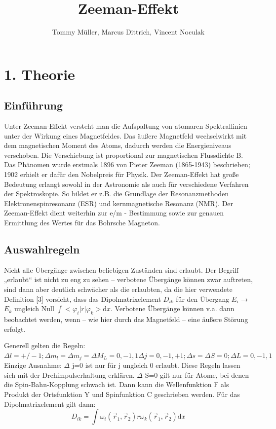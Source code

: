\documentclass[10pt,a4paper]{article}
\author{Tommy Müller, Marcus Dittrich, Vincent Noculak}
\title{Zeeman-Effekt}
\begin{document}
\maketitle
\newpage
\tableofcontents
\newpage

\section{1. Theorie}

\subsection{ Einführung}


Unter Zeeman-Effekt versteht man die Aufspaltung von atomaren Spektrallinien unter der Wirkung eines Magnetfeldes. Das äußere Magnetfeld wechselwirkt mit dem magnetischen Moment des Atoms, dadurch werden die Energieniveaus verschoben. Die Verschiebung ist proportional zur magnetischen Flussdichte B. Das Phänomen wurde erstmals 1896 von Pieter Zeeman (1865-1943) beschrieben; 1902 erhielt er dafür den Nobelpreis für Physik. Der Zeeman-Effekt hat große Bedeutung erlangt sowohl in der Astronomie als auch für verschiedene Verfahren der Spektroskopie. So bildet er z.B. die Grundlage der Resonanzmethoden Elektronenspinresonanz (ESR) und kernmagnetische Resonanz (NMR). Der Zeeman-Effekt dient weiterhin zur e/m - Bestimmung sowie zur genauen Ermittlung des Wertes für das Bohrsche Magneton.


\subsection{ Auswahlregeln}


Nicht alle Übergänge zwischen beliebigen Zuständen sind erlaubt. Der Begriff „erlaubt“ ist nicht zu eng zu sehen – verbotene Übergänge können zwar auftreten, sind dann aber deutlich schwächer als die erlaubten, da die hier verwendete Definition [3] vorsieht, dass das Dipolmatrixelement $D_{ik}$  für den Übergang $E_{i}$ → $E_{k}$ ungleich Null $\int <\varphi_{i} |r| \varphi_{k}>\mathrm{d}x$. Verbotene Übergänge können v.a. dann beobachtet werden, wenn – wie hier durch das Magnetfeld – eine äußere Störung erfolgt.   


Generell gelten die Regeln: $ \Delta l=+/-1 ;\Delta m_{l}=\Delta m_{j}= \Delta M_L=0 ,-1,1 \Delta j=0,-1,+1;\Delta s=\Delta S=0;\Delta L=0,-1,1$ Einzige Ausnahme: $\Delta$ j=0 ist nur für j ungleich 0 erlaubt. Diese Regeln lassen sich mit der Drehimpulserhaltung erklären. $\Delta$ S=0 gilt nur für Atome, bei denen die Spin-Bahn-Kopplung schwach ist. Dann kann die Wellenfunktion F  als Produkt der Ortsfunktion Y und Spinfunktion C geschrieben werden. Für das Dipolmatrixelement gilt dann: 
\begin{equation}
D_{ik}= \int\omega_{i}(\overrightarrow{r}_{1},\overrightarrow{r}_{2})r\omega_{k}(\overrightarrow{r}_{1},\overrightarrow{r}_{2})\mathrm{d}x
\end{equation}
\end{document}
